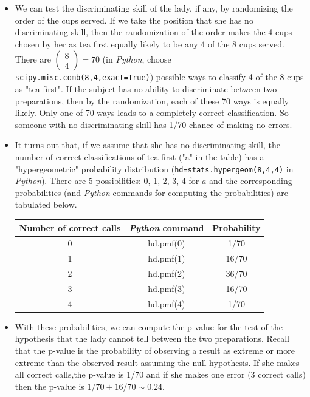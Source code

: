 \begin{itemize}
  \item We can test the discriminating skill of the lady, if any, by randomizing the order of the cups served. If we take the position that she has no discriminating skill, then the randomization of the order makes the 4 cups chosen by her as tea first equally likely to be any 4 of the 8 cups served. There are $\left( {\begin{array}{*{20}{c}}
8\\
4
\end{array}} \right) = 70$ (in \emph{Python}, choose \lstinline{scipy.misc.comb(8,4,exact=True)}) possible ways to classify 4 of the 8 cups as "tea first". If the subject has no ability to discriminate between two preparations, then by the randomization, each of these 70 ways is equally likely. Only one of 70 ways leads to a completely correct classification. So someone with no discriminating skill has 1/70 chance of making no errors.

  \item It turns out that, if we assume that she has no discriminating skill, the number of correct classifications of tea first ("a" in the table) has a "hypergeometric" probability distribution (\lstinline{hd=stats.hypergeom(8,4,4)} in \emph{Python}). There are 5 possibilities: 0, 1, 2, 3, 4 for $a$ and the corresponding probabilities (and \emph{Python} commands for computing the probabilities) are tabulated below.

      \begin{tabular}{c|c|c}
        Number of correct calls & \emph{Python} command & Probability \\
        \hline
        0 & hd.pmf(0) & 1/70 \\
        1 & hd.pmf(1) & 16/70 \\
        2 & hd.pmf(2) & 36/70 \\
        3 & hd.pmf(3) & 16/70 \\
        4 & hd.pmf(4) & 1/70
      \end{tabular}


  \item With these probabilities, we can compute the p-value for the test of the hypothesis that the lady cannot tell between the two preparations. Recall that the p-value is the probability of observing a result as extreme or more extreme than the observed result assuming the null hypothesis. If she makes all correct calls,the p-value is 1/70 and if she makes one error (3 correct calls) then the p-value is $1/70 + 16/70 \sim 0.24$.

\end{itemize}
  	
